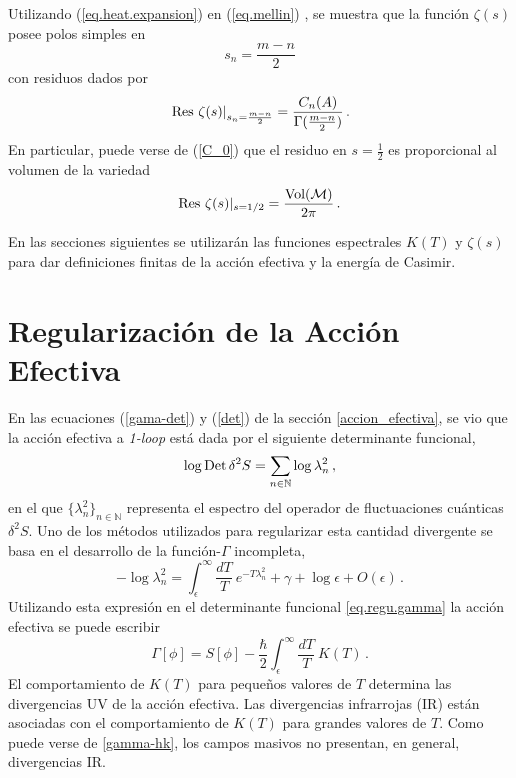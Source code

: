 Utilizando (\ref{eq.heat.expansion}) en  (\ref{eq.mellin}) , se muestra que la función $\zeta (s)$ posee polos simples en
\begin{equation}
s _n = \frac{m-n}{2} 
\label{eq.ceros.zeta}
\end{equation}
con residuos dados por
\begin{equation}
\left. {\rm Res} \ \zeta  (s)  \right| _{s_n= \frac{m - n}{2}} =  
\frac{ C_n  (A) }{ {\Gamma ( \frac{m-n}{2}} ) }
	\, .
\label{losresi}
\end{equation}
En particular, puede verse de (\ref{C_0}) que el residuo en $s=\frac{1}{2}$ es proporcional al volumen de la variedad
\begin{equation}\label{eq.vol}
	{\rm Res} \ \zeta (s) | _{s=1/2} = \frac{ {\rm Vol (\mathcal{M})} }{2 \pi} \, .
\end{equation}


En las secciones siguientes se utilizarán las funciones espectrales $K(T)$ y $\zeta(s) $ para dar definiciones finitas de la acción efectiva y la energía de Casimir.

\section{Regularización de la Acción Efectiva}\label{cap.acc}

En las ecuaciones (\ref{gama-det}) y (\ref{det}) de la sección \ref{accion_efectiva}, se vio que la acción efectiva a {\it 1-loop} está dada por el siguiente determinante funcional,
\begin{equation}\label{eq.regu.gamma}
    \log {\rm Det} \, \delta ^2 S = 
    \sum_{n\in{\mathbb N}} \log \lambda ^2 _n
    \, ,
\end{equation}
en el que $\{\lambda ^2 _n\}_{n\in\mathbb N}$ representa el espectro del operador de fluctuaciones cuánticas $\delta^2S$. Uno de los métodos utilizados para regularizar esta cantidad divergente se basa en el desarrollo de la función-$\Gamma$ incompleta,
\begin{equation}
- \log\lambda ^2 _n=\int _ { \epsilon } ^{\infty}\frac{dT}{T}\ e ^{- T \lambda ^2 _n} +\gamma+\log\epsilon + O ( \epsilon  ) \,.
\end{equation}
Utilizando esta expresión en el determinante funcional  \eqref{eq.regu.gamma} la acción efectiva se puede escribir
\begin{equation}\label{gamma-hk}
\Gamma [ \phi ] = 
S[ \phi ] - 
\frac{\hbar }{2}
\int _ { \epsilon } ^{\infty} \frac{ dT}{T}\ K(T) \, .
\end{equation}
El comportamiento de $K(T)$ para pequeños valores de $T$ determina las divergencias UV de la acción efectiva. Las divergencias infrarrojas (IR) están asociadas con el comportamiento de $K(T)$ para grandes valores de $T$. Como puede verse de \eqref{gamma-hk}, los campos masivos no presentan, en general, divergencias IR.

